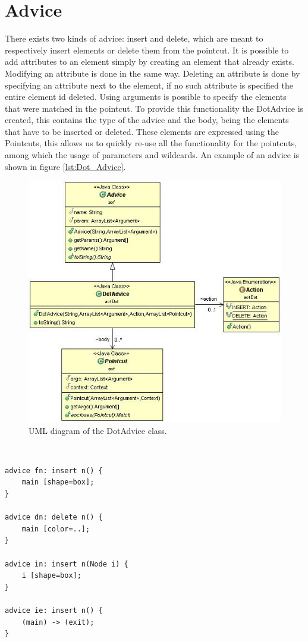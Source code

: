 \documentclass[a4paper]{report}
\begin{document}
\section{Advice}
There exists two kinds of advice: insert and delete, which are meant to respectively insert elements or delete them from the pointcut. It is possible to add attributes to an element simply by creating an element that already exists. Modifying an attribute is done in the same way. Deleting an attribute is done by specifying an attribute next to the element, if no such attribute is specified the entire element id deleted. Using arguments is possible to specify the elements that were matched in the pointcut. To provide this functionality the DotAdvice is created, this contains the type of the advice and the body, being the elements that have to be inserted or deleted. These elements are expressed using the Pointcuts, this allows us to quickly re-use all the functionality for the pointcuts, among which the usage of parameters and wildcards. An example of an advice is shown in figure \ref{lst:Dot_Advice}.\\
\begin{figure}
\centering
\includegraphics[scale=0.6]{images/AOFDot/DotAdvice.jpg}
\caption{UML diagram of the DotAdvice class.}
\label{fig:DotAdvice}
\end{figure}
\\
\begin{lstlisting}[caption=An example of advice., label=lst:Dot_Advice]
advice fn: insert n() {
	main [shape=box];
}

advice dn: delete n() {
	main [color=..];
}

advice in: insert n(Node i) {
	i [shape=box];
}

advice ie: insert n() {
	(main) -> (exit);
}
\end{lstlisting}
\end{document}
